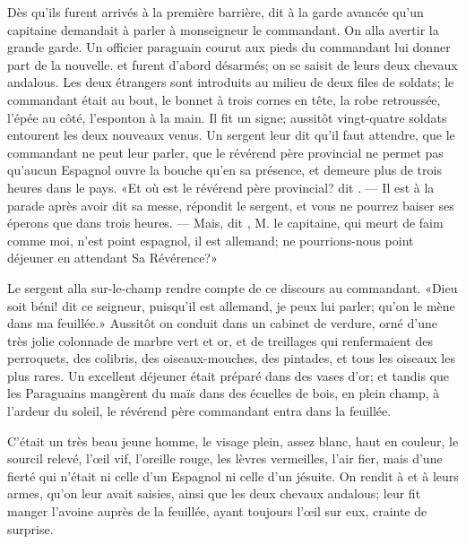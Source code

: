 Dès qu’ils furent arrivés à la première barrière,  dit à la
garde avancée qu’un capitaine demandait à parler à monseigneur le
commandant. On alla avertir la grande garde. Un officier paraguain
courut aux pieds du commandant lui donner part de la nouvelle. 
et  furent d’abord désarmés; on se saisit de leurs deux chevaux
andalous. Les deux étrangers sont introduits au milieu de deux files de
soldats; le commandant était au bout, le bonnet à trois cornes en tête,
la robe retroussée, l’épée au côté, l’esponton à la main. Il fit un
signe; aussitôt vingt-quatre soldats entourent les deux nouveaux venus.
Un sergent leur dit qu’il faut attendre, que le commandant ne peut leur
parler, que le révérend père provincial ne permet pas qu’aucun Espagnol
ouvre la bouche qu’en sa présence, et demeure plus de trois heures dans
le pays. «Et où est le révérend père provincial? dit . — Il est à
la parade après avoir dit sa messe, répondit le sergent, et vous ne
pourrez baiser ses éperons que dans trois heures. — Mais, dit ,
M. le capitaine, qui meurt de faim comme moi, n’est point
espagnol, il est allemand; ne pourrions-nous point déjeuner en
attendant Sa Révérence?»

Le sergent alla sur-le-champ rendre compte de ce discours au
commandant. «Dieu soit béni! dit ce seigneur, puisqu’il est allemand, je
peux lui parler; qu’on le mène dans ma feuillée.» Aussitôt on conduit
 dans un cabinet de verdure, orné d’une très jolie colonnade de
marbre vert et or, et de treillages qui renfermaient des perroquets,
des colibris, des oiseaux-mouches, des pintades, et tous les oiseaux
les plus rares. Un excellent déjeuner était préparé dans des vases
d’or; et tandis que les Paraguains mangèrent du maïs dans des écuelles
de bois, en plein champ, à l’ardeur du soleil, le révérend père
commandant entra dans la feuillée.

C’était un très beau jeune homme, le visage plein, assez blanc, haut en
couleur, le sourcil relevé, l’œil vif, l’oreille rouge, les lèvres
vermeilles, l’air fier, mais d’une fierté qui n’était ni celle d’un
Espagnol ni celle d’un jésuite. On rendit à  et à  leurs
armes, qu’on leur avait saisies, ainsi que les deux 
chevaux
 andalous;
 leur fit manger l’avoine auprès de la feuillée, ayant toujours
l’œil sur eux, crainte de surprise.



